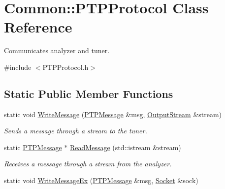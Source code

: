 \hypertarget{class_common_1_1_p_t_p_protocol}{\section{Common\-:\-:P\-T\-P\-Protocol Class Reference}
\label{class_common_1_1_p_t_p_protocol}
}


Communicates analyzer and tuner.  




{\ttfamily \#include $<$P\-T\-P\-Protocol.\-h$>$}

\subsection*{Static Public Member Functions}
\begin{DoxyCompactItemize}
\item 
\hypertarget{class_common_1_1_p_t_p_protocol_abd98607c51b2934bbbad21d899f2b460}{static void \hyperlink{class_common_1_1_p_t_p_protocol_abd98607c51b2934bbbad21d899f2b460}{Write\-Message} (\hyperlink{class_common_1_1_p_t_p_message}{P\-T\-P\-Message} \&msg, \hyperlink{class_common_1_1_output_stream}{Output\-Stream} \&stream)}\label{class_common_1_1_p_t_p_protocol_abd98607c51b2934bbbad21d899f2b460}

\begin{DoxyCompactList}\small\item\em Sends a message through a stream to the tuner. \end{DoxyCompactList}\item 
\hypertarget{class_common_1_1_p_t_p_protocol_a075f252ac5dd290fc0f372224c1097b4}{static \hyperlink{class_common_1_1_p_t_p_message}{P\-T\-P\-Message} $\ast$ \hyperlink{class_common_1_1_p_t_p_protocol_a075f252ac5dd290fc0f372224c1097b4}{Read\-Message} (std\-::istream \&stream)}\label{class_common_1_1_p_t_p_protocol_a075f252ac5dd290fc0f372224c1097b4}

\begin{DoxyCompactList}\small\item\em Receives a message through a stream from the analyzer. \end{DoxyCompactList}\item 
\hypertarget{class_common_1_1_p_t_p_protocol_acc152836fd36e641e964fea44b5b1064}{static void \hyperlink{class_common_1_1_p_t_p_protocol_acc152836fd36e641e964fea44b5b1064}{Write\-Message\-Ex} (\hyperlink{class_common_1_1_p_t_p_message}{P\-T\-P\-Message} \&msg, \hyperlink{class_common_1_1_socket}{Socket} \&sock)}\label{class_common_1_1_p_t_p_protocol_acc152836fd36e641e964fea44b5b1064}


\end{DoxyCompactItemize}

